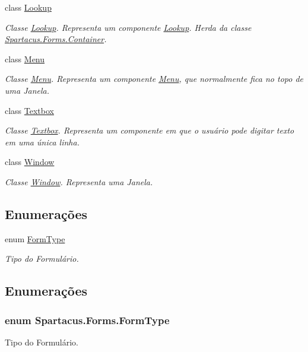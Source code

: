 \begin{DoxyCompactItemize}
class \hyperlink{classSpartacus_1_1Forms_1_1Lookup}{Lookup}
\begin{DoxyCompactList}\small\item\em Classe \hyperlink{classSpartacus_1_1Forms_1_1Lookup}{Lookup}. Representa um componente \hyperlink{classSpartacus_1_1Forms_1_1Lookup}{Lookup}. Herda da classe \hyperlink{classSpartacus_1_1Forms_1_1Container}{Spartacus.\+Forms.\+Container}. \end{DoxyCompactList}\item 
class \hyperlink{classSpartacus_1_1Forms_1_1Menu}{Menu}
\begin{DoxyCompactList}\small\item\em Classe \hyperlink{classSpartacus_1_1Forms_1_1Menu}{Menu}. Representa um componente \hyperlink{classSpartacus_1_1Forms_1_1Menu}{Menu}, que normalmente fica no topo de uma Janela. \end{DoxyCompactList}\item 
class \hyperlink{classSpartacus_1_1Forms_1_1Textbox}{Textbox}
\begin{DoxyCompactList}\small\item\em Classe \hyperlink{classSpartacus_1_1Forms_1_1Textbox}{Textbox}. Representa um componente em que o usuário pode digitar texto em uma única linha. \end{DoxyCompactList}\item 
class \hyperlink{classSpartacus_1_1Forms_1_1Window}{Window}
\begin{DoxyCompactList}\small\item\em Classe \hyperlink{classSpartacus_1_1Forms_1_1Window}{Window}. Representa uma Janela. \end{DoxyCompactList}\end{DoxyCompactItemize}
\subsection*{Enumerações}
\begin{DoxyCompactItemize}
\item 
enum \hyperlink{namespaceSpartacus_1_1Forms_a643b0061bf6bb33fc8816dbf7388d8ec}{Form\+Type} 
\begin{DoxyCompactList}\small\item\em Tipo do Formulário. \end{DoxyCompactList}\end{DoxyCompactItemize}


\subsection{Enumerações}
\hypertarget{namespaceSpartacus_1_1Forms_a643b0061bf6bb33fc8816dbf7388d8ec}{
\subsubsection[{Form\+Type}]{\setlength{\rightskip}{0pt plus 5cm}enum {\bf Spartacus.\+Forms.\+Form\+Type}}}\label{namespaceSpartacus_1_1Forms_a643b0061bf6bb33fc8816dbf7388d8ec}


Tipo do Formulário. 

